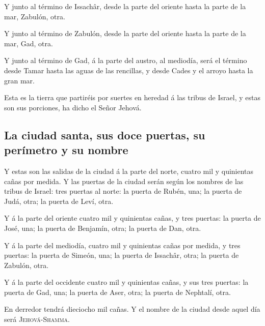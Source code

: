  Y junto al término de Issachâr, desde la parte del
oriente hasta la parte de la mar, Zabulón, otra.

 Y junto al término de Zabulón, desde la parte del
oriente hasta la parte de la mar, Gad, otra.

 Y junto al término de Gad, á la parte del austro, al
mediodía, será el término desde Tamar hasta las aguas de las rencillas,
y desde Cades y el arroyo hasta la gran mar.

 Esta es la tierra que partiréis por suertes en heredad á
las tribus de Israel, y estas son sus porciones, ha dicho el Señor
Jehová.

\hypertarget{la-ciudad-santa-sus-doce-puertas-su-peruxedmetro-y-su-nombre}{%
\subsection{La ciudad santa, sus doce puertas, su perímetro y su
nombre}\label{la-ciudad-santa-sus-doce-puertas-su-peruxedmetro-y-su-nombre}}

 Y estas son las salidas de la ciudad á la parte del
norte, cuatro mil y quinientas cañas por medida.  Y las
puertas de la ciudad serán según los nombres de las tribus de Israel:
tres puertas al norte: la puerta de Rubén, una; la puerta de Judá, otra;
la puerta de Leví, otra.

 Y á la parte del oriente cuatro mil y quinientas cañas,
y tres puertas: la puerta de José, una; la puerta de Benjamín, otra; la
puerta de Dan, otra.

 Y á la parte del mediodía, cuatro mil y quinientas cañas
por medida, y tres puertas: la puerta de Simeón, una; la puerta de
Issachâr, otra; la puerta de Zabulón, otra.

 Y á la parte del occidente cuatro mil y quinientas
cañas, y sus tres puertas: la puerta de Gad, una; la puerta de Aser,
otra; la puerta de Nephtalí, otra.

 En derredor tendrá dieciocho mil cañas. Y el nombre de
la ciudad desde aquel día será \textsc{Jehová}-\textsc{Shamma}.
